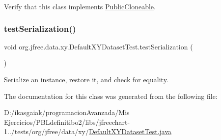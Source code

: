 Verify that this class implements \mbox{\hyperlink{}{Public\+Cloneable}}. \mbox{\label{classorg_1_1jfree_1_1data_1_1xy_1_1_default_x_y_dataset_test_a91e8123ce81eeed1ce69e775d4931adc}} 
\subsubsection{\texorpdfstring{test\+Serialization()}{testSerialization()}}
{\footnotesize\ttfamily void org.\+jfree.\+data.\+xy.\+Default\+X\+Y\+Dataset\+Test.\+test\+Serialization (\begin{DoxyParamCaption}{ }\end{DoxyParamCaption})}

Serialize an instance, restore it, and check for equality. 

The documentation for this class was generated from the following file\+:\begin{DoxyCompactItemize}
\item 
D\+:/ikasgaiak/programacion\+Avanzada/\+Mis Ejercicios/\+P\+B\+Ldefinitibo2/libs/jfreechart-\/1../tests/org/jfree/data/xy/\mbox{\hyperlink{_default_x_y_dataset_test_8java}{Default\+X\+Y\+Dataset\+Test.\+java}}\end{DoxyCompactItemize}
